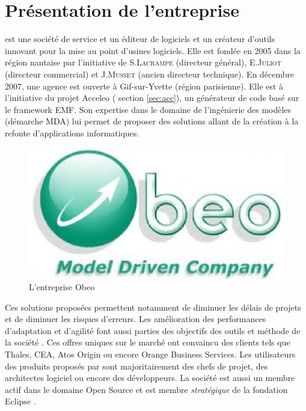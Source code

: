 \section{Présentation de l'entreprise}
\kwobeo{} est une société de service et un éditeur de logiciels et un créateur d'outils innovant pour la mise au point d'usines logiciels\cite{obeo}.  Elle est fondée en 2005 dans la région nantaise par l'initiative de S.\textsc{Lacrampe} (directeur général), E.\textsc{Juliot} (directeur commercial) et J.\textsc{Musset} (ancien directeur technique). En décembre 2007, une agence est ouverte à Gif-sur-Yvette (région parisienne). Elle est à l'initiative du projet Acceleo (\cf{} section \ref{sec:acc}), un générateur de code basé sur le framework EMF. Son expertise dans le domaine de l'ingénierie des modèles (démarche MDA) lui permet de proposer des solutions allant de la création à la refonte d'applications informatiques. 
\begin{figure}[htb]
  \centering
  \includegraphics[scale=.45]{img/logoobeo.eps}
  \caption{L'entreprise Obeo}
\end{figure}


Ces solutions proposées permettent notamment de diminuer les délais de projets et de diminuer les risques d'erreurs. Les amélioration des performances d'adaptation et d'agilité font aussi parties des objectifs des outils et méthode de la société \kwobeo{}. Ces offres uniques sur le marché ont convaincu des clients tels que Thales, CEA, Atos Origin ou encore Orange Business Services. Les utilisateurs des produits proposés par \kwobeo sont majoritairement des chefs de projet, des architectes logiciel ou encore des développeurs.
La société \kwobeo{} est aussi un membre actif dans le domaine Open Source et est membre \emph{stratégique} de la fondation Eclipse \cite{fondation}.

\clearpage

